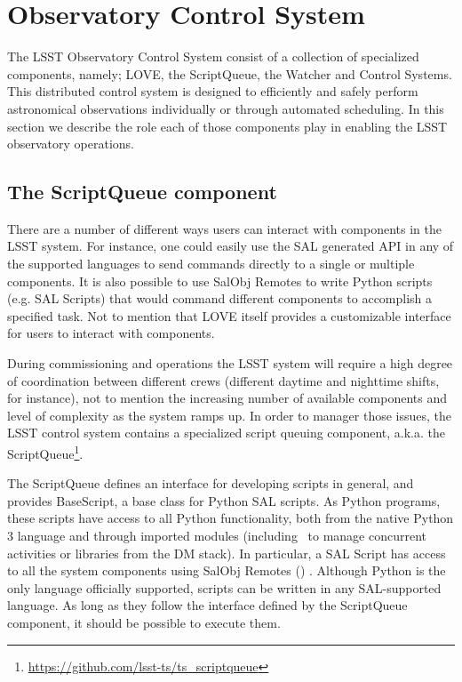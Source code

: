 \section{Observatory Control System}\label{sect:ocs}
The LSST Observatory Control System consist of a collection of specialized components, namely; LOVE, the ScriptQueue, 
the Watcher and Control Systems. This distributed control system is designed to efficiently and safely perform astronomical 
observations individually or through automated scheduling. In this section we describe the role each of those components play 
in enabling the LSST observatory operations. 

\subsection{The ScriptQueue component} \label{sect:scriptq}
There are a number of different ways users can interact with components in the LSST system. For instance, one could easily use the 
SAL generated API in any of the supported languages to send commands directly to a single or multiple components. It is also possible 
to use SalObj Remotes to write Python scripts (e.g. SAL Scripts) that would command different components to accomplish a specified 
task. Not to mention that LOVE itself provides a customizable interface for users to interact with components.

During commissioning and operations the LSST system will require a high degree of coordination between different crews 
(different daytime and nighttime shifts, for instance), not to mention the increasing number of available components and level of 
complexity as the system ramps up. In order to manager those issues, the LSST control system contains a specialized script 
queuing component, a.k.a. the ScriptQueue\footnote{\url{https://github.com/lsst-ts/ts_scriptqueue}}.

The ScriptQueue defines an interface for developing scripts in general, and provides BaseScript, a base class for Python SAL scripts. 
As Python programs, these scripts have access to all Python functionality, both from the native Python 3 language and through 
imported modules (including \asyncio~to manage concurrent activities or libraries from the DM stack). In particular, a SAL Script 
has access to all the system components using SalObj Remotes () . Although Python is the only language 
officially supported, scripts can be written in any SAL-supported language. As long as they follow the interface defined by the 
ScriptQueue component, it should be possible to execute them.

